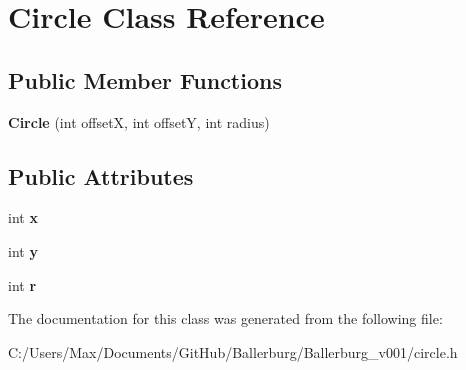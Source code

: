 \section{Circle Class Reference}
\label{class_circle}
\subsection*{Public Member Functions}
\begin{DoxyCompactItemize}
\item 
{\bfseries Circle} (int offset\+X, int offset\+Y, int radius)\label{class_circle_a899b70433bcb874e6eab17a5d56fc6aa}

\end{DoxyCompactItemize}
\subsection*{Public Attributes}
\begin{DoxyCompactItemize}
\item 
int {\bfseries x}\label{class_circle_abceecd15b990054ddc30441cfcbb205d}

\item 
int {\bfseries y}\label{class_circle_a78aef28b3c176d14e8d25f8cd84e7dfd}

\item 
int {\bfseries r}\label{class_circle_a067c0b8ccbda5ca1f518dd89a1d55989}

\end{DoxyCompactItemize}


The documentation for this class was generated from the following file\+:\begin{DoxyCompactItemize}
\item 
C\+:/\+Users/\+Max/\+Documents/\+Git\+Hub/\+Ballerburg/\+Ballerburg\+\_\+v001/circle.\+h\end{DoxyCompactItemize}
